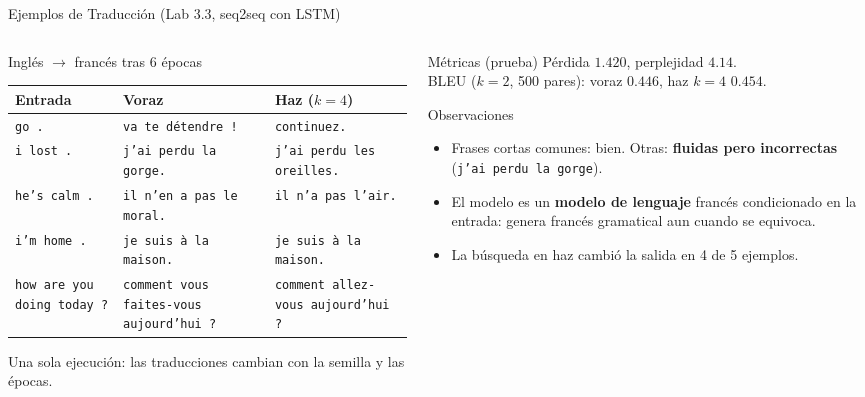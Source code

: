 \documentclass[aspectratio=169, 10pt]{beamer}
\begin{document}
\begin{frame}[shrink]{Ejemplos de Traducci\'on (Lab 3.3, seq2seq con LSTM)}

	\begin{columns}[T]
		\begin{column}{0.62\textwidth}
			\begin{block}{Ingl\'es $\to$ franc\'es tras 6 \'epocas}
				\scriptsize
				\renewcommand{\arraystretch}{1.2}
				\begin{tabular}{@{}>{\raggedright}p{2.0cm}>{\raggedright}p{2.9cm}>{\raggedright\arraybackslash}p{2.9cm}@{}}
					\toprule
					Entrada & Voraz & Haz ($k=4$) \\
					\midrule
					\texttt{go .} & \texttt{va te d\'etendre !} & \texttt{continuez.} \\
					\texttt{i lost .} & \texttt{j'ai perdu la gorge.} & \texttt{j'ai perdu les oreilles.} \\
					\texttt{he's calm .} & \texttt{il n'en a pas le moral.} & \texttt{il n'a pas l'air.} \\
					\texttt{i'm home .} & \texttt{je suis \`a la maison.} & \texttt{je suis \`a la maison.} \\
					\texttt{how are you doing today ?} & \texttt{comment vous faites-vous aujourd'hui ?} & \texttt{comment allez-vous aujourd'hui ?} \\
					\bottomrule
				\end{tabular}
			\end{block}
			{\scriptsize Una sola ejecuci\'on: las traducciones cambian con la semilla y las \'epocas.}
		\end{column}

		\begin{column}{0.35\textwidth}
			\begin{block}{M\'etricas (prueba)}
				\small
				P\'erdida $1.420$, perplejidad $4.14$.\\
				BLEU ($k=2$, 500 pares): voraz $0.446$, haz $k=4$ $0.454$.
			\end{block}
			\begin{block}{Observaciones}
				\small
				\begin{itemize}
					\item Frases cortas comunes: bien. Otras: \textbf{fluidas pero incorrectas} (\texttt{j'ai perdu la gorge}).
					\item El modelo es un \textbf{modelo de lenguaje} franc\'es condicionado en la entrada: genera francés gramatical aun cuando se equivoca.
					\item La b\'usqueda en haz cambi\'o la salida en 4 de 5 ejemplos.
				\end{itemize}
			\end{block}
		\end{column}
	\end{columns}

\end{frame}
\end{document}
